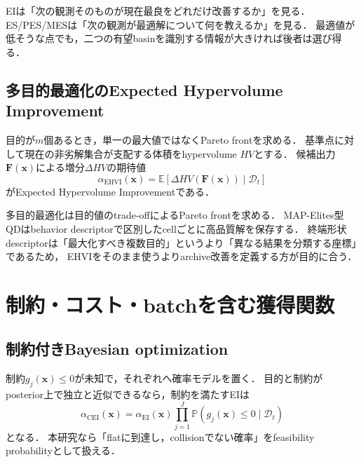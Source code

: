 \documentclass[a4paper,11pt]{ltjsarticle}
\newcommand{\E}{\mathbb E}
\newcommand{\Pp}{\mathbb P}
\newcommand{\D}{\mathcal D}
\begin{document}
\begin{intuitionbox}
EIは「次の観測そのものが現在最良をどれだけ改善するか」を見る．
ES/PES/MESは「次の観測が最適解について何を教えるか」を見る．
最適値が低そうな点でも，二つの有望basinを識別する情報が大きければ後者は選び得る．
\end{intuitionbox}

\subsection{多目的最適化のExpected Hypervolume Improvement}

目的が\(m\)個あるとき，単一の最大値ではなくPareto frontを求める．
基準点に対して現在の非劣解集合が支配する体積をhypervolume \(HV\)とする．
候補出力\(\bm F(\bm x)\)による増分\(\Delta HV\)の期待値
\begin{equation}
  \alpha_{\mathrm{EHVI}}(\bm x)
  =\E[\Delta HV(\bm F(\bm x))\mid\D_t]
  \label{eq:ehvi}
\end{equation}
がExpected Hypervolume Improvementである．

\begin{cautionbox}[多目的最適化とQDは同じではない]
多目的最適化は目的値のtrade-offによるPareto frontを求める．
MAP-Elites型QDはbehavior descriptorで区別したcellごとに高品質解を保存する．
終端形状descriptorは「最大化すべき複数目的」というより「異なる結果を分類する座標」であるため，
EHVIをそのまま使うよりarchive改善を定義する方が目的に合う．
\end{cautionbox}

\section{制約・コスト・batchを含む獲得関数}
\label{sec:acquisition-extensions}

\subsection{制約付きBayesian optimization}

制約\(g_j(\bm x)\leq0\)が未知で，それぞれへ確率モデルを置く．
目的と制約がposterior上で独立と近似できるなら，制約を満たすEIは
\begin{equation}
  \alpha_{\mathrm{CEI}}(\bm x)
  =\alpha_{\mathrm{EI}}(\bm x)
  \prod_{j=1}^J\Pp(g_j(\bm x)\leq0\mid\D_t)
  \label{eq:constrained-ei}
\end{equation}
となる\citep{gardner2014constrained}．
本研究なら「flatに到達し，collisionでない確率」をfeasibility probabilityとして扱える．
\end{document}
